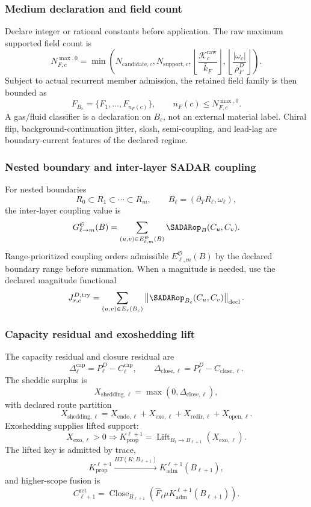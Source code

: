 \subsubsection{Medium declaration and field count}
\label{subsec:medium-declaration-field-count}
Declare integer or rational constants before application. The raw maximum supported field count is
\[
N^{\max,0}_{F,c}
=
\min\left(
N_{\mathrm{candidate},c},
N_{\mathrm{support},c},
\left\lfloor\frac{\mathcal K^{\mathrm{raw}}_c}{\bar k_F}\right\rfloor,
\left\lfloor\frac{|\omega_c|}{\bar\rho^D_F}\right\rfloor
\right).
\]
Subject to actual recurrent member admission, the retained field family is then bounded as
\[
F_{B_c}=\{F_1,\ldots,F_{n_F(c)}\},
\qquad
n_F(c)\le N^{\max,0}_{F,c}.
\]
A gas/fluid classifier is a declaration on \(B_c\), not an external material label. Chiral flip, background-continuation jitter, slosh, semi-coupling, and lead-lag are boundary-current features of the declared regime.



\subsubsection{Nested boundary and inter-layer SADAR coupling}
\label{subsec:interlayer-sadar-coupling}
For nested boundaries
\[
R_0\subset R_1\subset\cdots\subset R_m,
\qquad
B_\ell=(\partial_T R_\ell,\omega_\ell),
\]
the inter-layer coupling value is
\[
G^{\mathfrak S}_{\ell\to m}(B)
=
\sum_{(u,v)\in E^{\mathfrak S}_{\ell,m}(B)}
\SADARop_B(C_u,C_v).
\]
Range-prioritized coupling orders admissible \(E^{\mathfrak S}_{\ell,m}(B)\) by the declared boundary range before summation. When a magnitude is needed, use the declared magnitude functional
\[
J^{D,\mathrm{try}}_{r,c}
=
\sum_{(u,v)\in E_r(B_c)}
\left\|\SADARop_{B_c}(C_u,C_v)\right\|_{\mathrm{decl}}.
\]

\subsubsection{Capacity residual and exoshedding lift}
\label{subsec:capacity-residual-exoshedding-lift}
The capacity residual and closure residual are
\[
\Delta^{\mathrm{cap}}_\ell=P^D_\ell-C^{\mathrm{cap}}_\ell,
\qquad
\Delta_{\mathrm{close},\ell}=P^D_\ell-C_{\mathrm{close},\ell}.
\]
The sheddic surplus is
\[
X_{\mathrm{shedding},\ell}=\max(0,\Delta_{\mathrm{close},\ell}),
\]
with declared route partition
\[
X_{\mathrm{shedding},\ell}=X_{\mathrm{endo},\ell}+X_{\mathrm{exo},\ell}+X_{\mathrm{redir},\ell}+X_{\mathrm{open},\ell}.
\]
Exoshedding supplies lifted support:
\[
X_{\mathrm{exo},\ell}>0
\Rightarrow
K_{\mathrm{prop}}^{\ell+1}
=
\operatorname{Lift}_{B_\ell\to B_{\ell+1}}
\left(X_{\mathrm{exo},\ell}\right).
\]
The lifted key is admitted by trace,
\[
K_{\mathrm{prop}}^{\ell+1}
\xrightarrow{HT(K;B_{\ell+1})}
K_{\mathrm{adm}}^{\ell+1}(B_{\ell+1}),
\]
and higher-scope fusion is
\[
C^{\mathrm{ret}}_{\ell+1}
=
\operatorname{Close}_{B_{\ell+1}}
\left(
\widehat F_\ell
\mu
K_{\mathrm{adm}}^{\ell+1}(B_{\ell+1})
\right).
\]

